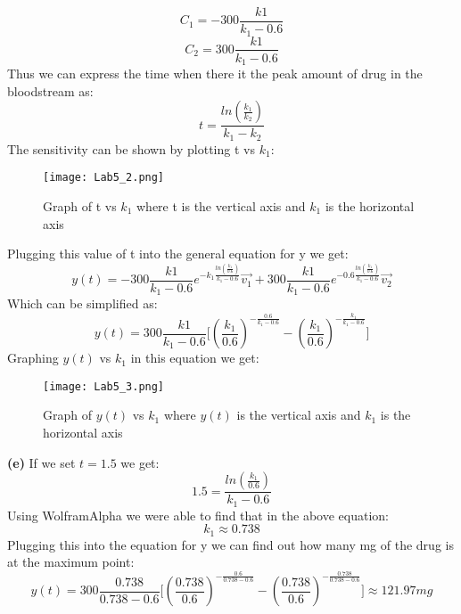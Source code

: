 \documentclass[english]{article}
\begin{document}
\begin{flushleft}
$$C_1=-300\frac{k1}{k_1-0.6}$$
$$C_2=300\frac{k1}{k_1-0.6}$$
Thus we can express the time when there it the peak amount of drug in the bloodstream as: 
$$t=\frac{ln(\frac{k_1}{k_2})}{k_1-k_2}$$
The sensitivity can be shown by plotting t vs $k_1$:
\begin{figure}[H]
\begin{center}
\texttt{[image: Lab5\_2.png]}
\end{center}
\caption{Graph of t vs $k_1$ where t is the vertical axis and $k_1$ is the horizontal axis}
\end{figure}
Plugging this value of t into the general equation for y we get:
$$y(t)=-300\frac{k1}{k_1-0.6}e^{-k_1\frac{ln(\frac{k_1}{0.6})}{k_1-0.6}}\vec{v_1}+300\frac{k1}{k_1-0.6}e^{-0.6\frac{ln(\frac{k_1}{0.6})}{k_1-0.6}}\vec{v_2}$$
Which can be simplified as:
$$y(t)=300\frac{k1}{k_1-0.6}\lbrack(\frac{k_1}{0.6})^{-\frac{0.6}{k_1-0.6}}-(\frac{k_1}{0.6})^{-\frac{k_1}{k_1-0.6}}\rbrack$$
Graphing $y(t)$ vs $k_1$ in this equation we get:
\begin{figure}[H]
\begin{center}
\texttt{[image: Lab5\_3.png]}
\end{center}
\caption{Graph of $y(t)$ vs $k_1$ where $y(t)$ is the vertical axis and $k_1$ is the horizontal axis}
\end{figure}
\textbf{(e)} If we set $t=1.5$ we get:
$$1.5=\frac{ln(\frac{k_1}{0.6})}{k_1-0.6}$$
Using WolframAlpha we were able to find that in the above equation:
$$k_1\approx0.738$$
Plugging this into the equation for y we can find out how many mg of the drug is at the maximum point:
$$y(t)=300\frac{0.738}{0.738-0.6}\lbrack(\frac{0.738}{0.6})^{-\frac{0.6}{0.738-0.6}}-(\frac{0.738}{0.6})^{-\frac{0.738}{0.738-0.6}}\rbrack\approx121.97mg$$
\end{flushleft}
\end{document}
